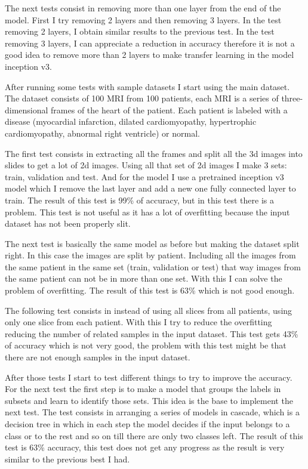 \documentclass[12pt,a4paper]{article}
\begin{document}
The next tests consist in removing more than one layer from the end of the model. First I try removing 2 layers and then removing 3 layers. In the test removing 2 layers, I obtain similar results to the previous test. In the test removing 3 layers, I can appreciate a reduction in accuracy therefore it is not a good idea to remove more than 2 layers to make transfer learning in the model inception v3.
\bigskip

After running some tests with sample datasets I start using the main dataset. The dataset consists of 100 MRI from 100 patients, each MRI is a series of three-dimensional frames of the heart of the patient. Each patient is labeled with a disease (myocardial infarction, dilated cardiomyopathy, hypertrophic cardiomyopathy, abnormal right ventricle) or normal.
\bigskip

The first test consists in extracting all the frames and split all the 3d images into slides to get a lot of 2d images. Using all that set of 2d images I make 3 sets: train, validation and test. And for the model I use a pretrained inception v3 model which I remove the last layer and add a new one fully connected layer to train. The result of this test is 99\% of accuracy, but in this test there is a problem. This test is not useful as it has a lot of overfitting because the input dataset has not been properly slit.
\bigskip

The next test is basically the same model as before but making the dataset split right. In this case the images are split by patient. Including all the images from the same patient in the same set (train, validation or test) that way images from the same patient can not be in more than one set. With this I can solve the problem of overfitting. The result of this test is 63\% which is not good enough.
\bigskip

The following test consists in instead of using all slices from all patients, using only one slice from each patient. With this I try to reduce the overfitting reducing the number of related samples in the input dataset. This test gets 43\% of accuracy which is not very good, the problem with this test might be that there are not enough samples in the input dataset.
\bigskip

After those tests I start to test different things to try to improve the accuracy. For the next test the first step is to make a model that groups the labels in subsets and learn to identify those sets. This idea is the base to implement the next test. The test consists in arranging a series of models in cascade, which is a decision tree in which in each step the model decides if the input belongs to a class or to the rest and so on till there are only two classes left. The result of this test is 63\% accuracy, this test does not get any progress as the result is very similar to the previous best I had.
\bigskip
\end{document}

